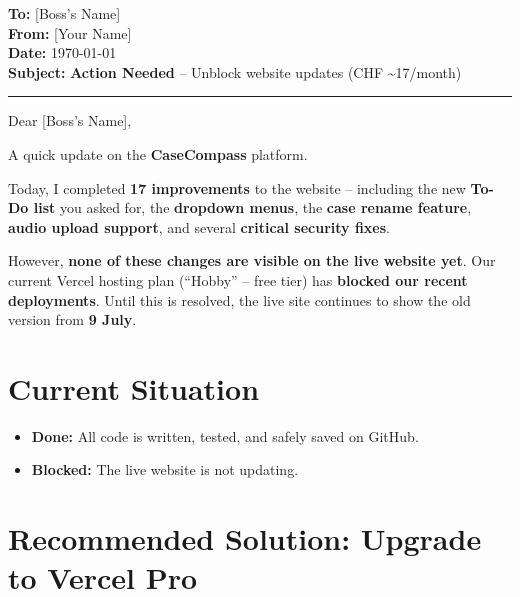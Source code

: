 \documentclass[11pt,a4paper]{article}
\title{}
\author{}
\date{}
\begin{document}
\noindent\textbf{To:} [Boss's Name] \\
\textbf{From:} [Your Name] \\
\textbf{Date:} \today \\
\textbf{Subject:} \textcolor{danger}{\textbf{Action Needed}} -- Unblock website updates (CHF \textasciitilde17/month)

\vspace{0.5cm}
\hrule
\vspace{0.5cm}

Dear [Boss's Name],

\vspace{0.3cm}

A quick update on the \textbf{CaseCompass} platform.

\vspace{0.3cm}

Today, I completed \textbf{17 improvements} to the website -- including the new \textbf{To-Do list} you asked for, the \textbf{dropdown menus}, the \textbf{case rename feature}, \textbf{audio upload support}, and several \textbf{critical security fixes}.

However, \textcolor{danger}{\textbf{none of these changes are visible on the live website yet}}. Our current Vercel hosting plan (``Hobby'' -- free tier) has \textbf{blocked our recent deployments}. Until this is resolved, the live site continues to show the old version from \textbf{9 July}.

\section*{Current Situation}

\begin{itemize}[leftmargin=*]
  \item \textcolor{success}{\textbf{Done:}} All code is written, tested, and safely saved on GitHub.
  \item \textcolor{danger}{\textbf{Blocked:}} The live website is not updating.
\end{itemize}

\section*{Recommended Solution: Upgrade to Vercel Pro}
\end{document}
